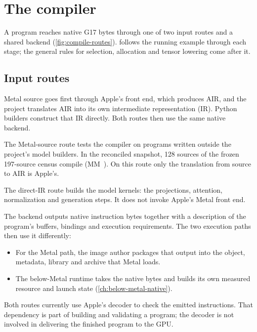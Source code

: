 \chapter{The compiler}\label{ch:compiling}

A program reaches native G17 bytes through one of two input routes and a shared backend (\cref{fig:compile-routes}).
 follows the running example through each stage; the general rules for selection,
allocation and tensor lowering come after it.

\section{Input routes}\label{ch:source-native-program}

Metal source goes first through Apple's front end, which produces AIR, and the project translates AIR into its own
intermediate representation (IR). Python builders construct that IR directly. Both routes then use the same native
backend.



The Metal-source route tests the compiler on programs written outside the project's model builders. In the
reconciled snapshot, 128 sources of the frozen 197-source census compile (MM~). On this route only the
translation from source to AIR is Apple's.

The direct-IR route builds the model kernels: the projections, attention, normalization and generation steps. It
does not invoke Apple's Metal front end.

The backend outputs native instruction bytes together with a description of the
program's buffers, bindings and execution requirements. The two execution paths then use it differently:

\begin{itemize}
\item For the Metal path, the image author packages that output into the object, metadata, library and archive that Metal
  loads.
\item The below-Metal runtime takes the native bytes and builds its own measured resource and launch state (\cref{ch:below-metal-native}).
\end{itemize}

Both routes currently use Apple's decoder to check the emitted instructions. That dependency is part of building and
validating a program; the decoder is not involved in delivering the finished program to the GPU.

